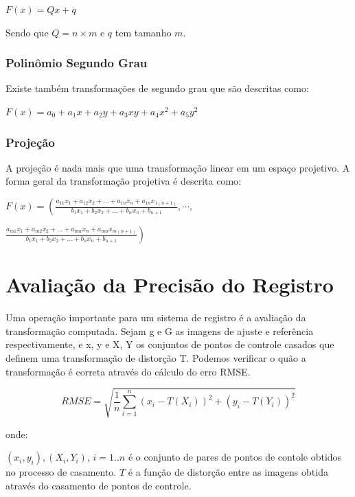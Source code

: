 \documentclass[9pt, a4paper, nofonttune, journal]{IEEEtran}
\begin{document}
\begin{center}
$F(x)=Qx+q$\end{center}
Sendo que $Q=n\times m$ e $q$ tem tamanho $m$. \cite{CGPPBook1}

\subsubsection{Polinômio Segundo Grau}
Existe também transformações de segundo grau que são descritas como:
\begin{center}
$F(x)=a_{0}+a_{1}x+a_{2}y+a_{3}xy+a_{4}x^{2}+a_{5}y^{2}$\end{center}

\subsubsection{Projeção}

A projeção é nada mais que uma transformação linear em um espaço projetivo.\cite{CGPPBook1}
A forma geral da transformação projetiva é descrita como:

$F(x)=\left( \frac{a_{11}x_{1}+a_{12}x_{2}+...+a_{1n}x_{n}+a_{1n}x_{1(n+1)}}{b_{1}x_{1}+b_{2}x_{2}+...+b_{n}x_{n}+b_{n+1}},\cdots,\right.$

\begin{center}
$\left. \frac{a_{m1}x_{1}+a_{m2}x_{2}+...+a_{mn}x_{n}+a_{mn}x_{m(n+1)}}{b_{1}x_{1}+b_{2}x_{2}+...+b_{n}x_{n}+b_{n+1}} \right)$\end{center}



\section{Avaliação da Precisão do Registro}
Uma operação importante para um sistema de registro é a avaliação da transformação computada. Sejam {g} e {G} as imagens de ajuste e referência respectivamente, e {x, y} e {X, Y} os conjuntos de pontos de controle casados que definem uma transformação de distorção {T}. Podemos verificar o quão a transformação é correta através do cálculo do erro RMSE.

$$
	RMSE = \sqrt{\frac{1}{n}\sum\limits_{i=1}^{n}(x_i - T(X_i))^2 + (y_i - T(Y_i))^2}
$$

onde:

$(x_i, y_i), (X_i, Y_i)$, $i = 1..n$ é o conjunto de pares de pontos de contole obtidos no processo de casamento.
$T$ é a função de distorção entre as imagens obtida através do casamento de pontos de controle.
\end{document}
